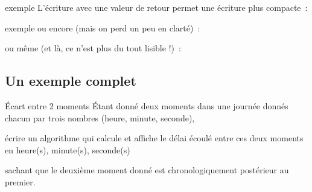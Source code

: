 \begin{frame}{exemple}
	L'écriture avec une valeur de retour permet une
	écriture plus compacte~:

	\bigskip
	
\end{frame}

	\bigskip
	
\begin{frame}{exemple}
	ou encore (mais on perd un peu en clarté)~:

	\bigskip
	

	\bigskip
	
	ou même (et là, ce n'est plus du tout lisible !)~:

	\bigskip
	
\end{frame}

\subsection{Un exemple complet}

\begin{frame}{Écart entre 2 moments}
	Étant donné deux moments dans une journée donnés chacun par trois
	nombres (heure, minute, seconde), 
	
	écrire un algorithme qui calcule et
	affiche le délai écoulé entre ces deux moments en heure(s), minute(s),
	seconde(s) 
	
	sachant que le deuxième moment donné est chronologiquement
	postérieur au premier.
\end{frame}


